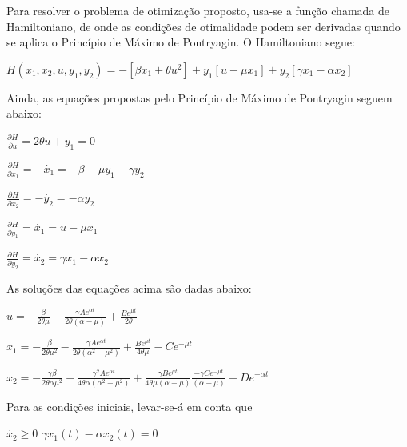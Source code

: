 \documentclass[14pt, oneside]{book}
\theoremstyle{definition}
\begin{document}
             Para resolver o problema de otimização proposto, usa-se a função chamada de Hamiltoniano, de onde as condições de otimalidade podem ser derivadas quando se aplica o Princípio de Máximo de Pontryagin. O Hamiltoniano segue:
            
            \begin{center}
                $H(x_1,x_2,u,y_1,y_2) = -\left[\beta x_1 + \theta u^2 \right] + y_1\left[u - \mu x_1 \right] + y_2\left[\gamma x_1 - \alpha x_2 \right]$
            \end{center}
            
             Ainda, as equações propostas pelo Princípio de Máximo de Pontryagin seguem abaixo:
            
            \begin{center}
                $\frac{\partial H}{\partial u} = 2\theta u + y_1 = 0$
                
                $\frac{\partial H}{\partial x_1} = -\dot{x_1} = -\beta - \mu y_1 + \gamma y_2$
                
                $\frac{\partial H}{\partial x_2} = -\dot{y_2} = -\alpha y_2$
                
                $\frac{\partial H}{\partial y_1} = \dot{x_1} = u-\mu x_1$
                
                $\frac{\partial H}{\partial y_2} = \dot{x_2} = \gamma x_1 - \alpha x_2$
            \end{center}
            
            As soluções das equações acima são dadas abaixo:
            
            \begin{center}
                $u = -\frac{\beta}{2\theta \mu} - \frac{\gamma A e^{\alpha t}}{2\theta (\alpha - \mu)} + \frac{B e^{\mu t}}{2\theta}$
                
                $x_1 = -\frac{\beta}{2\theta \mu^2} - \frac{\gamma A e^{\alpha t}}{2\theta (\alpha^2 - \mu^2)} + \frac{Be^{\mu t}}{4\theta \mu} - Ce^{-\mu t}$
                
                $x_2 = -\frac{\gamma \beta}{2\theta \alpha \mu^2} - \frac{\gamma^2 Ae^{\alpha t}}{4\theta \alpha (\alpha^2 - \mu^2)} + \frac{\gamma Be^{\mu t}}{4\theta \mu (\alpha + \mu)} \frac{-\gamma Ce^{-\mu t}}{(\alpha - \mu)} + De^{-\alpha t}$
            \end{center}
            
            Para as condições iniciais, levar-se-á em conta que
            \begin{center}
            $\dot{x_2} \geq 0$ \implies $\gamma x_1(t) - \alpha x_2(t) = 0$    
            \end{center}
            
\end{document}
